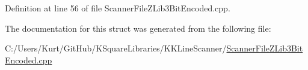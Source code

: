 Definition at line 56 of file Scanner\+File\+Z\+Lib3\+Bit\+Encoded.\+cpp.



The documentation for this struct was generated from the following file\+:\begin{DoxyCompactItemize}
\item 
C\+:/\+Users/\+Kurt/\+Git\+Hub/\+K\+Square\+Libraries/\+K\+K\+Line\+Scanner/\hyperlink{_scanner_file_z_lib3_bit_encoded_8cpp}{Scanner\+File\+Z\+Lib3\+Bit\+Encoded.\+cpp}\end{DoxyCompactItemize}
